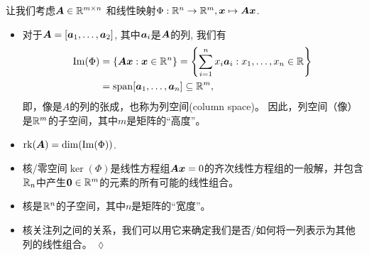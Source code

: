 \begin{remark}
    让我们考虑$\boldsymbol{A} \in \mathbb{R}^{m \times n}$
    和线性映射$\Phi : \mathbb{R}^n \rightarrow \mathbb{R}^m, \boldsymbol{x} \mapsto \boldsymbol{A}\boldsymbol{x}$.
    \begin{itemize}
        \item 对于$\boldsymbol{A} = [\boldsymbol{a}_1, \dots, \boldsymbol{a}_2]$, 其中$\boldsymbol{a}_i$是$\boldsymbol{A}$的列, 我们有
        \begin{subequations}
            \begin{align}
                \mathrm{Im}(\Phi) &= \{\boldsymbol{A}\boldsymbol{x}: \boldsymbol{x} \in \mathbb{R}^n\}
                = \left\{
                    \sum_{i=1}^{n} x_i \boldsymbol{a}_i : x_1, \dots, x_n \in \mathbb{R}
                \right\}\\
                &= \mathrm{span}[\boldsymbol{a}_1,\dots,\boldsymbol{a}_n] \subseteq \mathbb{R}^m,
            \end{align}
        \end{subequations}
        即，像是$A$的列的张成，也称为列空间(column space)。
        因此，列空间（像）是$\mathbb{R}^m$的子空间，其中$m$是矩阵的“高度”。
        \item $\mathrm{rk}(\boldsymbol{A}) = \dim(\mathrm{Im}(\Phi))$.
        \item 核/零空间$\ker(\Phi)$是线性方程组$\boldsymbol{A}\boldsymbol{x} = 0$的齐次线性方程组的一般解，并包含$\mathbb{R}_n$中产生$\boldsymbol{0} \in \mathbb{R}^m$的元素的所有可能的线性组合。
        \item 核是$\mathbb{R}^n$的子空间，其中$n$是矩阵的“宽度”。
        \item 核关注列之间的关系，我们可以用它来确定我们是否/如何将一列表示为其他列的线性组合。
        \hfill $\lozenge$
    \end{itemize}
\end{remark}

